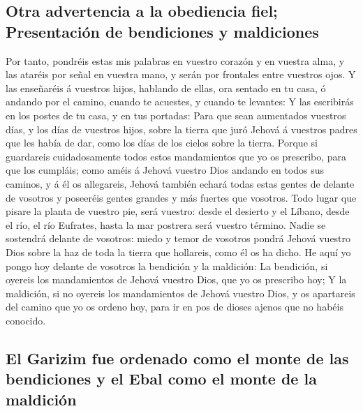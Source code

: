 \hypertarget{otra-advertencia-a-la-obediencia-fiel-presentaciuxf3n-de-bendiciones-y-maldiciones}{%
\subsection{Otra advertencia a la obediencia fiel; Presentación de
bendiciones y
maldiciones}\label{otra-advertencia-a-la-obediencia-fiel-presentaciuxf3n-de-bendiciones-y-maldiciones}}

 Por tanto, pondréis estas mis palabras en vuestro
corazón y en vuestra alma, y las ataréis por señal en vuestra mano, y
serán por frontales entre vuestros ojos.  Y las
enseñaréis á vuestros hijos, hablando de ellas, ora sentado en tu casa,
ó andando por el camino, cuando te acuestes, y cuando te levantes:
 Y las escribirás en los postes de tu casa, y en tus
portadas:  Para que sean aumentados vuestros días, y los
días de vuestros hijos, sobre la tierra que juró Jehová á vuestros
padres que les había de dar, como los días de los cielos sobre la
tierra.  Porque si guardareis cuidadosamente todos estos
mandamientos que yo os prescribo, para que los cumpláis; como améis á
Jehová vuestro Dios andando en todos sus caminos, y á él os allegareis,
 Jehová también echará todas estas gentes de delante de
vosotros y poseeréis gentes grandes y más fuertes que vosotros.
 Todo lugar que pisare la planta de vuestro pie, será
vuestro: desde el desierto y el Líbano, desde el río, el río Eufrates,
hasta la mar postrera será vuestro término.  Nadie se
sostendrá delante de vosotros: miedo y temor de vosotros pondrá Jehová
vuestro Dios sobre la haz de toda la tierra que hollareis, como él os ha
dicho.  He aquí yo pongo hoy delante de vosotros la
bendición y la maldición:  La bendición, si oyereis los
mandamientos de Jehová vuestro Dios, que yo os prescribo hoy;
 Y la maldición, si no oyereis los mandamientos de Jehová
vuestro Dios, y os apartareis del camino que yo os ordeno hoy, para ir
en pos de dioses ajenos que no habéis conocido.

\hypertarget{el-garizim-fue-ordenado-como-el-monte-de-las-bendiciones-y-el-ebal-como-el-monte-de-la-maldiciuxf3n}{%
\subsection{El Garizim fue ordenado como el monte de las bendiciones y
el Ebal como el monte de la
maldición}\label{el-garizim-fue-ordenado-como-el-monte-de-las-bendiciones-y-el-ebal-como-el-monte-de-la-maldiciuxf3n}}

